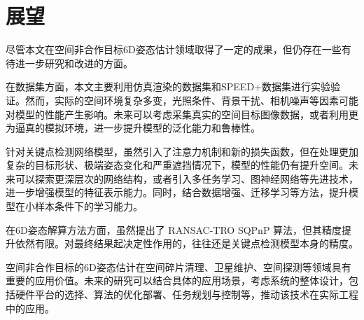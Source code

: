 \section{展望}

尽管本文在空间非合作目标6D姿态估计领域取得了一定的成果，但仍存在一些有待进一步研究和改进的方面。

在数据集方面，本文主要利用仿真渲染的数据集和SPEED+数据集进行实验验证。然而，实际的空间环境复杂多变，光照条件、背景干扰、相机噪声等因素可能对模型的性能产生影响。未来可以考虑采集真实的空间目标图像数据，或者利用更为逼真的模拟环境，进一步提升模型的泛化能力和鲁棒性。

针对关键点检测网络模型，虽然引入了注意力机制和新的损失函数，但在处理更加复杂的目标形状、极端姿态变化和严重遮挡情况下，模型的性能仍有提升空间。未来可以探索更深层次的网络结构，或者引入多任务学习、图神经网络等先进技术，进一步增强模型的特征表示能力。同时，结合数据增强、迁移学习等方法，提升模型在小样本条件下的学习能力。

在6D姿态解算方法方面，虽然提出了 RANSAC-TRO SQPnP 算法，但其精度提升依然有限。对最终结果起决定性作用的，往往还是关键点检测模型本身的精度。

空间非合作目标的6D姿态估计在空间碎片清理、卫星维护、空间探测等领域具有重要的应用价值。未来的研究可以结合具体的应用场景，考虑系统的整体设计，包括硬件平台的选择、算法的优化部署、任务规划与控制等，推动该技术在实际工程中的应用。